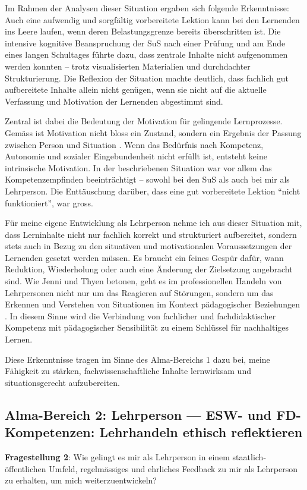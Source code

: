 \begin{myExBox}[title=Beispiel aus der eigenen Unterrichtserfahrung]
\end{myExBox}

Im Rahmen der Analysen dieser Situation ergaben sich folgende Erkenntnisse: Auch eine aufwendig und sorgfältig vorbereitete Lektion kann bei den Lernenden ins Leere laufen, wenn deren Belastungsgrenze bereits überschritten ist. Die intensive kognitive Beanspruchung der SuS nach einer Prüfung und am Ende eines langen Schultages führte dazu, dass zentrale Inhalte nicht aufgenommen werden konnten – trotz visualisierten Materialien und durchdachter Strukturierung. Die Reflexion der Situation machte deutlich, dass fachlich gut aufbereitete Inhalte allein nicht genügen, wenn sie nicht auf die aktuelle Verfassung und Motivation der Lernenden abgestimmt sind.

Zentral ist dabei die Bedeutung der Motivation für gelingende Lernprozesse. Gemäss \textcite{ryan, deci} ist Motivation nicht bloss ein Zustand, sondern ein Ergebnis der Passung zwischen Person und Situation \cite{ryan, deci, moeller}. Wenn das Bedürfnis nach Kompetenz, Autonomie und sozialer Eingebundenheit nicht erfüllt ist, entsteht keine intrinsische Motivation. In der beschriebenen Situation war vor allem das Kompetenzempfinden beeinträchtigt – sowohl bei den SuS als auch bei mir als Lehrperson. Die Enttäuschung darüber, dass eine gut vorbereitete Lektion \enquote{nicht funktioniert}, war gross.

Für meine eigene Entwicklung als Lehrperson nehme ich aus dieser Situation mit, dass Lerninhalte nicht nur fachlich korrekt und strukturiert aufbereitet, sondern stets auch in Bezug zu den situativen und motivationalen Voraussetzungen der Lernenden gesetzt werden müssen. Es braucht ein feines Gespür dafür, wann Reduktion, Wiederholung oder auch eine Änderung der Zielsetzung angebracht sind. Wie Jenni und Thyen betonen, geht es im professionellen Handeln von Lehrpersonen nicht nur um das Reagieren auf Störungen, sondern um das Erkennen und Verstehen von Situationen im Kontext pädagogischer Beziehungen \cite{jenni,thyen}. In diesem Sinne wird die Verbindung von fachlicher und fachdidaktischer Kompetenz mit pädagogischer Sensibilität zu einem Schlüssel für nachhaltiges Lernen.

Diese Erkenntnisse tragen im Sinne des Alma-Bereichs 1 dazu bei, meine Fähigkeit zu stärken, fachwissenschaftliche Inhalte lernwirksam und situationsgerecht aufzubereiten.


\subsection{Alma-Bereich 2: Lehrperson --- ESW- und FD-Kompetenzen: Lehrhandeln ethisch reflektieren}
\textbf{Fragestellung 2}: Wie gelingt es mir als Lehrperson in einem staatlich-öffentlichen Umfeld, regelmässiges und ehrliches Feedback zu mir als Lehrperson zu erhalten, um mich weiterzuentwickeln?

